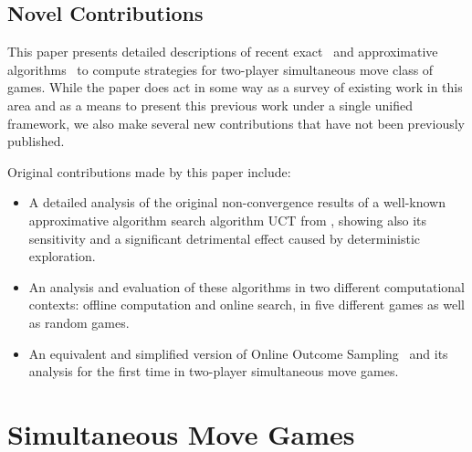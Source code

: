 \documentclass[preprint,12pt]{elsarticle}
\newcommand{\reviewchange}[1]{{\color{blue}#1}}
\begin{document}
\reviewchange{
\subsection{Novel Contributions}
\label{sec:contrib}

This paper presents detailed descriptions of recent exact~\cite{Bosansky13Using} and approximative
algorithms~\cite{Lanctot13Goofspiel,lisy2013-nips} to compute strategies for two-player simultaneous move class of games.
While the paper does act in some way as a survey of existing work in this area and as a means to present this previous work under a single unified framework, we also make several new contributions that have not been previously published.

Original contributions made by this paper include:

\begin{itemize}
\item A detailed analysis of the original non-convergence results of a well-known approximative algorithm search algorithm UCT from \cite{Shafiei09}, showing also its sensitivity and a significant detrimental effect caused by deterministic exploration.
\item An analysis and evaluation of these algorithms in two different computational contexts: offline computation and online search, in five different games as well as random games.
\item An equivalent and simplified version of Online Outcome Sampling~\cite{15aamas-iioos} and its analysis for the first time in two-player simultaneous move games.
\end{itemize}

}

\section{Simultaneous Move Games}  \label{sec:smg}
\end{document}
